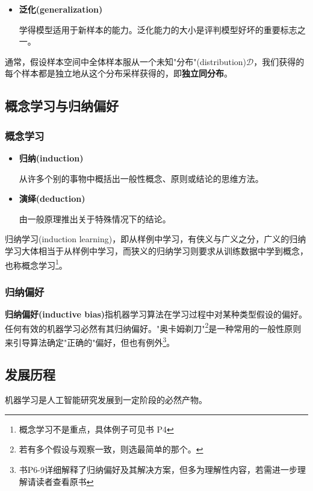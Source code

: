 \begin{itemize}
    \item \textbf{泛化(generalization) }
    
    学得模型适用于新样本的能力。泛化能力的大小是评判模型好坏的重要标志之一。
\end{itemize}

通常，假设样本空间中全体样本服从一个未知"分布"(distribution)$\mathcal{D}$，我们获得的每个样本都是独立地从这个分布采样获得的，即\textbf{独立同分布}。

\subsection{概念学习与归纳偏好}
\subsubsection{概念学习}

\begin{itemize}
    \item \textbf{归纳(induction)}
    
    从许多个别的事物中概括出一般性概念、原则或结论的思维方法。
    \item \textbf{演绎(deduction)}
    
    由一般原理推出关于特殊情况下的结论。
\end{itemize}

归纳学习(induction learning)，即从样例中学习，有侠义与广义之分，广义的归纳学习大体相当于从样例中学习，而狭义的归纳学习则要求从训练数据中学到概念，也称概念学习\footnote{概念学习不是重点，具体例子可见书 P4}。

\subsubsection{归纳偏好}

\textbf{归纳偏好(inductive bias)}指机器学习算法在学习过程中对某种类型假设的偏好。任何有效的机器学习必然有其归纳偏好。"奥卡姆剃刀"\footnote{若有多个假设与观察一致，则选最简单的那个。}是一种常用的一般性原则来引导算法确定"正确的"偏好，但也有例外\footnote{书P6-9详细解释了归纳偏好及其解决方案，但多为理解性内容，若需进一步理解请读者查看原书}。

\subsection{发展历程}

机器学习是人工智能研究发展到一定阶段的必然产物。

